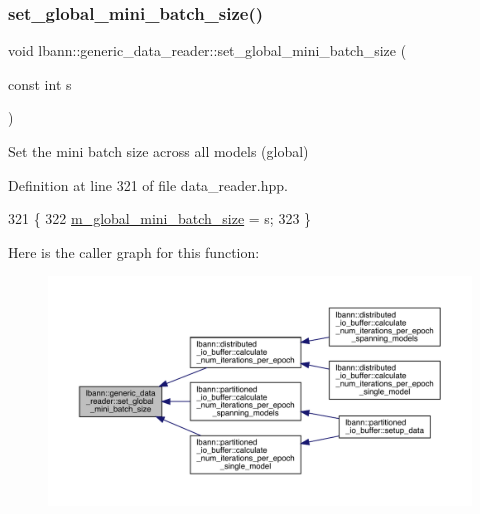 \subsubsection{\texorpdfstring{set\+\_\+global\+\_\+mini\+\_\+batch\+\_\+size()}{set\_global\_mini\_batch\_size()}}
{\footnotesize\ttfamily void lbann\+::generic\+\_\+data\+\_\+reader\+::set\+\_\+global\+\_\+mini\+\_\+batch\+\_\+size (\begin{DoxyParamCaption}\item[{const int}]{s }\end{DoxyParamCaption})\hspace{0.3cm}{\ttfamily [inline]}}



Set the mini batch size across all models (global) 



Definition at line 321 of file data\+\_\+reader.\+hpp.


\begin{DoxyCode}
321                                                \{
322     \hyperlink{classlbann_1_1generic__data__reader_a7cd8fa7b1db9ea3d154a411f36992476}{m\_global\_mini\_batch\_size} = s;
323   \}
\end{DoxyCode}
Here is the caller graph for this function\+:\nopagebreak
\begin{figure}[H]
\begin{center}
\leavevmode
\includegraphics[width=350pt]{classlbann_1_1generic__data__reader_a03388338e75d37e1b28389d22bd5b604_icgraph}
\end{center}
\end{figure}
\mbox{\label{classlbann_1_1generic__data__reader_ac6d4a5ba1d4e1134620cddcac343bf59}} 
